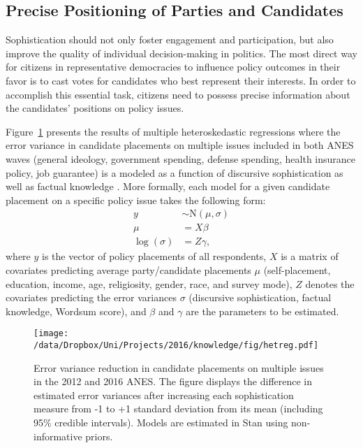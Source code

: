 \subsection*{Precise Positioning of Parties and Candidates}
Sophistication should not only foster engagement and participation, but also improve the quality of individual decision-making in politics. The most direct way for citizens in representative democracies to influence policy outcomes in their favor is to cast votes for candidates who best represent their interests. In order to accomplish this essential task, citizens need to possess precise information about the candidates' positions on policy issues.

Figure~\ref{fig:hetreg} presents the results of multiple heteroskedastic regressions where the error variance in candidate placements on multiple issues included in both ANES waves (general ideology, government spending, defense spending, health insurance policy, job guarantee) is a modeled as a function of discursive sophistication as well as factual knowledge \citep[see][for a similar procedure]{jacoby2006value}. More formally, each model for a given candidate placement on a specific policy issue takes the following form:
\begin{align}
y &\sim \text{N}(\mu, \sigma) \\
\mu &= X\beta \\
\log(\sigma) &= Z\gamma,
\end{align}
where $y$ is the vector of policy placements of all respondents, $X$ is a matrix of covariates predicting average party/candidate placements $\mu$ (self-placement, education, income, age, religiosity, gender, race, and survey mode), $Z$ denotes the covariates predicting the error variances $\sigma$ (discursive sophistication, factual knowledge, Wordsum score), and $\beta$ and $\gamma$ are the parameters to be estimated.

\begin{figure}[h]\centering
\texttt{[image: /data/Dropbox/Uni/Projects/2016/knowledge/fig/hetreg.pdf]}
\caption{Error variance reduction in candidate placements on multiple issues in the 2012 and 2016 ANES. The figure displays the difference in estimated error variances after increasing each sophistication measure from -1 to +1 standard deviation from its mean (including 95\% credible intervals). Models are estimated in Stan using non-informative priors.}\label{fig:hetreg}
\end{figure}

